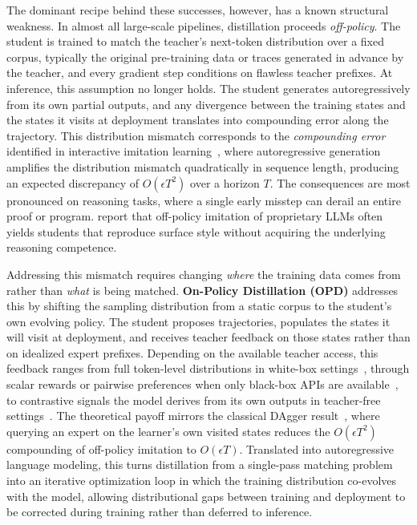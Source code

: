 \documentclass{article} %
\begin{document}
The dominant recipe behind these successes, however, has a known structural weakness. In almost all large-scale pipelines, distillation proceeds \emph{off-policy}. The student is trained to match the teacher's next-token distribution over a fixed corpus, typically the original pre-training data or traces generated in advance by the teacher, and every gradient step conditions on flawless teacher prefixes. At inference, this assumption no longer holds. The student generates autoregressively from its own partial outputs, and any divergence between the training states and the states it visits at deployment translates into compounding error along the trajectory. This distribution mismatch corresponds to the \emph{compounding error} identified in interactive imitation learning~\citep{1011.0686}, where autoregressive generation amplifies the distribution mismatch quadratically in sequence length, producing an expected discrepancy of $O(\epsilon T^2)$ over a horizon $T$. The consequences are most pronounced on reasoning tasks, where a single early misstep can derail an entire proof or program. \citet{2305.15717} report that off-policy imitation of proprietary LLMs often yields students that reproduce surface style without acquiring the underlying reasoning competence.

Addressing this mismatch requires changing \emph{where} the training data comes from rather than \emph{what} is being matched. \textbf{On-Policy Distillation (OPD)} addresses this by shifting the sampling distribution from a static corpus to the student's own evolving policy. The student proposes trajectories, populates the states it will visit at deployment, and receives teacher feedback on those states rather than on idealized expert prefixes. Depending on the available teacher access, this feedback ranges from full token-level distributions in white-box settings~\citep{2306.13649,2306.08543}, through scalar rewards or pairwise preferences when only black-box APIs are available~\citep{2511.10643,2305.12870}, to contrastive signals the model derives from its own outputs in teacher-free settings~\citep{2601.18734}. The theoretical payoff mirrors the classical DAgger result~\citep{1011.0686}, where querying an expert on the learner's own visited states reduces the $O(\epsilon T^2)$ compounding of off-policy imitation to $O(\epsilon T)$. Translated into autoregressive language modeling, this turns distillation from a single-pass matching problem into an iterative optimization loop in which the training distribution co-evolves with the model, allowing distributional gaps between training and deployment to be corrected during training rather than deferred to inference.
\end{document}
